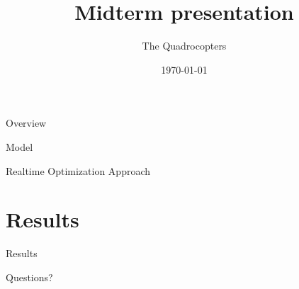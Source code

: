\documentclass[12pt]{beamer}
\title{Midterm presentation}
\author{The Quadrocopters}
\institute{Technische Universität München}
\date{\today}
\begin{document}
\begin{frame}
\maketitle
\end{frame}

\begin{frame}{Overview}
\tableofcontents
\end{frame}

%


\begin{frame}{ }
\begin{block}{ }
\centering
\LARGE
 \vspace{1ex}
Model \\
\vspace{1ex}
\end{block}
\end{frame}

\begin{frame}{ }
\begin{block}{ }
\centering
\LARGE
 \vspace{1ex}
Realtime Optimization Approach\\
\vspace{1ex}
\end{block}
\end{frame}


\section{Results}
\begin{frame}{ }
\begin{block}{ }
\centering
\LARGE
 \vspace{1ex}
Results\\
\vspace{1ex}
\end{block}
\end{frame}

\begin{frame}{ }
\begin{block}{ }
\centering
\LARGE
 \vspace{1ex}
Questions? \\
\vspace{1ex}
\end{block}
\end{frame}

\nocite{Boyd2009}
\nocite{Diehl2001}
\nocite{Diehl2002}
\nocite{Diehl2005}
\nocite{Diebel2006}
\nocite{Garcia2013}
\nocite{Richter-Gebert2009}
\nocite{Reyes-Valeria2013}
\nocite{Hartmann2014}

	
	
\end{document}
